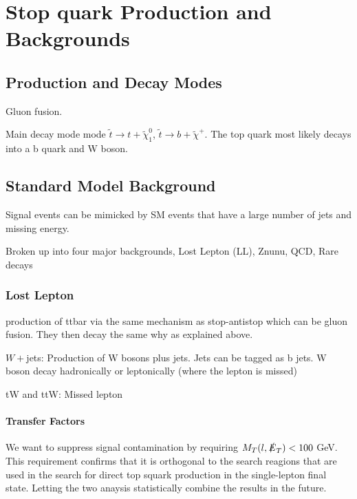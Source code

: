 \chapter{Stop quark Production and Backgrounds}
\label{ch:Search}



\section{Production and Decay Modes}
\label{sec:Production}

Gluon fusion.

Main decay mode mode $\tilde{t}\rightarrow t+\tilde{\chi}^{0}_{1}$, $\tilde{t}\rightarrow b+\tilde{\chi}^{+}$. The top quark most likely decays into a b quark and W boson. 

\section{Standard Model Background}
\label{sec:SMBackground}

Signal events can be mimicked by SM events that have a large number of jets and missing energy. 

Broken up into four major backgrounds, Lost Lepton (LL), Znunu, QCD, Rare decays

\subsection{Lost Lepton}
\label{subsec:LL}

\ttbar{} production of ttbar via the same mechanism as stop-antistop which can be gluon fusion. They then decay the same why as explained above.

$W+$jets: Production of W bosons plus jets. Jets can be tagged as b jets. W boson decay hadronically or leptonically (where the lepton is missed)

tW and ttW: Missed lepton

\subsubsection{Transfer Factors}
\label{subsec:TF}

We want to suppress signal contamination by requiring $M_{T}(l, \slashed{E}_{T}) < 100$ GeV. This requirement confirms that it is orthogonal to the search reagions that are used in the search for direct top squark production in the single-lepton final state. Letting the two anaysis statistically combine the results in the future. 

